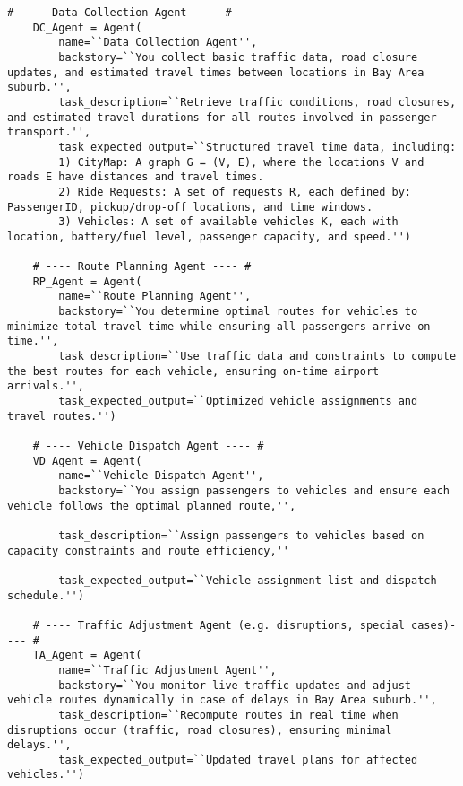\begin{lstlisting}[style=PythonStyle, caption=Collaborative Agents and Prompts, label=lst:agent_pipelinep3p4]
    # ---- Data Collection Agent ---- #
    DC_Agent = Agent(
        name=``Data Collection Agent'',
        backstory=``You collect basic traffic data, road closure updates, and estimated travel times between locations in Bay Area suburb.'',
        task_description=``Retrieve traffic conditions, road closures, and estimated travel durations for all routes involved in passenger transport.'',
        task_expected_output=``Structured travel time data, including:
        1) CityMap: A graph G = (V, E), where the locations V and roads E have distances and travel times.
        2) Ride Requests: A set of requests R, each defined by: PassengerID, pickup/drop-off locations, and time windows.
        3) Vehicles: A set of available vehicles K, each with location, battery/fuel level, passenger capacity, and speed.'')
        
    # ---- Route Planning Agent ---- #
    RP_Agent = Agent(
        name=``Route Planning Agent'',
        backstory=``You determine optimal routes for vehicles to minimize total travel time while ensuring all passengers arrive on time.'',
        task_description=``Use traffic data and constraints to compute the best routes for each vehicle, ensuring on-time airport arrivals.'',
        task_expected_output=``Optimized vehicle assignments and travel routes.'')
    
    # ---- Vehicle Dispatch Agent ---- #
    VD_Agent = Agent(
        name=``Vehicle Dispatch Agent'',
        backstory=``You assign passengers to vehicles and ensure each vehicle follows the optimal planned route,'',
        
        task_description=``Assign passengers to vehicles based on capacity constraints and route efficiency,''
        
        task_expected_output=``Vehicle assignment list and dispatch schedule.'')
    
    # ---- Traffic Adjustment Agent (e.g. disruptions, special cases)---- #
    TA_Agent = Agent(
        name=``Traffic Adjustment Agent'',
        backstory=``You monitor live traffic updates and adjust vehicle routes dynamically in case of delays in Bay Area suburb.'',
        task_description=``Recompute routes in real time when disruptions occur (traffic, road closures), ensuring minimal delays.'',
        task_expected_output=``Updated travel plans for affected vehicles.'')
    

\end{lstlisting}
